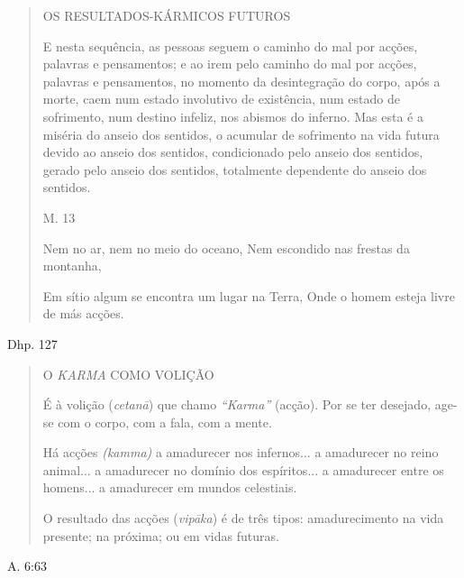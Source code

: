 \begin{quote}
OS RESULTADOS-KÁRMICOS FUTUROS

E nesta sequência, as pessoas seguem o caminho do mal por acções, palavras e pensamentos; e ao irem pelo caminho do mal por acções, palavras e pensamentos, no momento da desintegração do corpo, após a morte, caem num estado involutivo de existência, num estado de sofrimento, num destino infeliz, nos abismos do inferno. Mas esta é a miséria do anseio dos sentidos, o acumular de sofrimento na vida futura devido ao anseio dos sentidos, condicionado pelo anseio dos sentidos, gerado pelo anseio dos sentidos, totalmente dependente do anseio dos sentidos.

M. 13

Nem no ar, nem no meio do oceano, Nem escondido nas frestas da montanha,

Em sítio algum se encontra um lugar na Terra, Onde o homem esteja livre de más acções.
\end{quote}

Dhp. 127

\begin{quote}
O \emph{KARMA} COMO VOLIÇÃO

É à volição (\emph{cetanā}) que chamo \emph{``Karma''} (acção). Por se ter desejado, age-se com o corpo, com a fala, com a mente.

Há acções \emph{(kamma)} a amadurecer nos infernos... a amadurecer no reino animal... a amadurecer no domínio dos espíritos... a amadurecer entre os homens... a amadurecer em mundos celestiais.

O resultado das acções (\emph{vipāka}) é de três tipos: amadurecimento na vida presente; na próxima; ou em vidas futuras.
\end{quote}

A. 6:63

